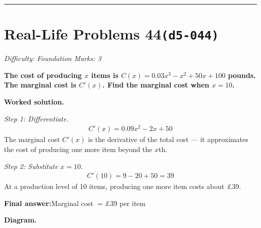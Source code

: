 \documentclass[11pt]{article}
\newcommand{\question}[1]{\par\medskip\noindent\textbf{#1}\par}
\begin{document}
\medskip\hrule

\section*{Real-Life Problems 44\quad\small\texttt{(d5-044)}}
\textit{Difficulty: Foundation \quad\textbar\quad Marks: 3}

\question{The cost of producing \( x \) items is \( C(x) = 0.03x^3 - x^2 + 50x + 100 \) pounds. The marginal cost is \( C'(x) \). Find the marginal cost when \( x = 10 \).}

\textbf{Worked solution.}

\textit{Step 1: Differentiate.}
\[\begin{gathered}
C'(x) = 0.09x^2 - 2x + 50
\end{gathered}\]
The marginal cost \( C'(x) \) is the derivative of the total cost --- it approximates the cost of producing one more item beyond the \( x \)th.

\textit{Step 2: Substitute \( x = 10 \).}
\[\begin{gathered}
C'(10) = 9 - 20 + 50 = 39
\end{gathered}\]
At a production level of 10 items, producing one more item costs about \pounds 39.

\begin{answerbox}
\textbf{Final answer:}\quad Marginal cost \(\displaystyle  = \pounds 39 \) per item
\end{answerbox}
\textbf{Diagram.}
\end{document}
